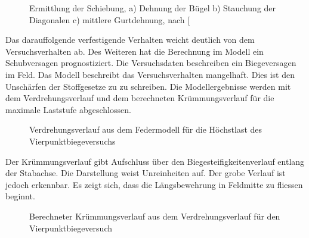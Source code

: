 \documentclass[
  11pt,
  letterpaper,
]{scrreprt}
\begin{document}
\begin{figure}[H]


\caption{\label{fig-sigrist_schiebung}Ermittlung der Schiebung, a)
Dehnung der Bügel b) Stauchung der Diagonalen c) mittlere Gurtdehnung,
nach {[}\citeproc{ref-sigrist_zum_1995}{4}{]}}

\end{figure}%

Das darauffolgende verfestigende Verhalten weicht deutlich von dem
Versuchsverhalten ab. Des Weiteren hat die Berechnung im Modell ein
Schubversagen prognostiziert. Die Versuchsdaten beschreiben ein
Biegeversagen im Feld. Das Modell beschreibt das Versuchsverhalten
mangelhaft. Dies ist den Unschärfen der Stoffgesetze zu zu schreiben.
Die Modellergebnisse werden mit dem Verdrehungsverlauf und dem
berechneten Krümmungsverlauf für die maximale Laststufe abgeschlossen.

\begin{figure}[H]


\caption{\label{fig-phi-max-sv14}Verdrehungsverlauf aus dem Federmodell
für die Höchstlast des Vierpunktbiegeversuchs}

\end{figure}%

Der Krümmungsverlauf gibt Aufschluss über den Biegesteifigkeitenverlauf
entlang der Stabachse. Die Darstellung weist Unreinheiten auf. Der grobe
Verlauf ist jedoch erkennbar. Es zeigt sich, dass die Längsbewehrung in
Feldmitte zu fliessen beginnt.

\begin{figure}[H]


\caption{\label{fig-chi-max-sv14}Berechneter Krümmungsverlauf aus dem
Verdrehungsverlauf für den Vierpunktbiegeversuch}

\end{figure}%
\end{document}
